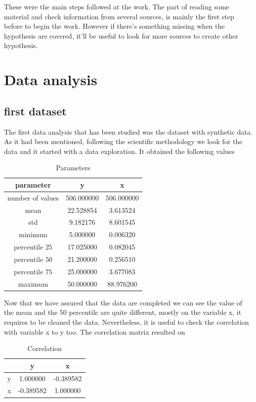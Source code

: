 \documentclass{article}
\begin{document}
These were the main steps followed at the work. The part of reading some material and check information from several sources, is mainly the first step before to begin the work. However if there's something missing when the hypothesis are covered, it'll be useful to look for more sources to create other hypothesis.

\section{Data analysis}
\subsection{first dataset}
The first data analysis that has been studied was the dataset with synthetic data. As it had been mentioned, following the scientific methodology we look for the data and it started with a data exploration.
It obtained the following values 
\begin{table}[H]
\begin{center}
  \begin{tabular}{|c|c|c|}
    \hline
   parameter & y & x \\ \hline
   number of values & 506.000000 & 506.000000\\
   mean  &  22.528854  &  3.613524\\
   std   &   9.182176  &  8.601545\\
   minimum   &   5.000000  &  0.006320\\
   percentile $25$   &  17.025000  &  0.082045\\
   percentile $50$   &  21.200000  &  0.256510\\
   percentile $75$   &  25.000000 &   3.677083\\
   maximum   &  50.000000  & 88.976200\\
   \hline
  \end{tabular}
  \caption{Parameters}
\end{center}
\end{table}
Now that we have assured that the data are completed we can see the value of the mean and the 50 percentile are quite different, mostly on the variable x, it requires to be cleaned the data. Nevertheless, it is useful to check the correlation with variable x to y too.
The correlation matrix resulted on 
\begin{table}[H]
\begin{center}
  \begin{tabular}{|c|c|c|}
    \hline
      & y & x  \\ \hline
     y&  1.000000 & -0.389582 \\
     x & -0.389582  & 1.000000 \\
     \hline
  \end{tabular}
  \caption{Correlation}
\end{center}
\end{table}
\end{document}
